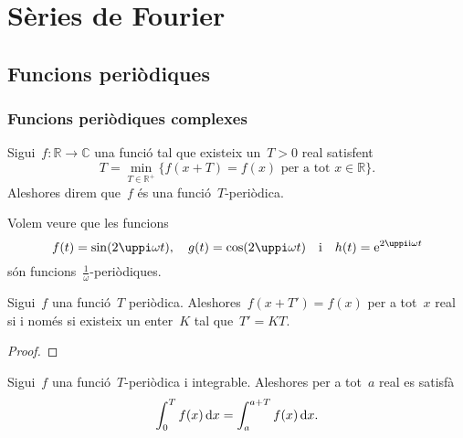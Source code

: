 \documentclass[../analisi-matematica.tex]{subfiles}
\begin{document}
\chapter{Sèries de Fourier}
\section{Funcions periòdiques}
    \subsection{Funcions periòdiques complexes}
    \begin{definition}
        \label{def:funcio-periodica}
        Sigui~\(f\colon\mathbb{R}\longrightarrow\mathbb{C}\) una funció tal que existeix un~\(T>0\) real satisfent
        \[
            T=\min_{T\in\mathbb{R}^{+}}\{f(x+T)=f(x)\text{ per a tot }x\in\mathbb{R}\}.
        \]
        Aleshores direm que~\(f\) és una funció~\(T\)-periòdica.
    \end{definition}
    \begin{example}
        \label{ex:periode-del-sinus}
        \label{ex:periode-del-cosinus}
        \label{ex:periode-de-lexponencial-complexa}
        Volem veure que les funcions
        \[
            f(t)=\sin(2\uppi\omega t),\quad g(t)=\cos(2\uppi\omega t)\quad\text{i}\quad h(t)=\e^{2\uppi\iu\omega t}
        \]
        són funcions~\(\frac{1}{\omega}\)-periòdiques.
    \end{example}
    \begin{solution}
    \end{solution}
    \begin{lemma}
        Sigui~\(f\) una funció~\(T\) periòdica.
        Aleshores~\(f(x+T')=f(x)\) per a tot~\(x\) real si i només si existeix un enter~\(K\) tal que~\(T'=KT\).
    \end{lemma}
    \begin{proof}
    \end{proof}
    \begin{proposition}
        \label{prop:podem-despla-ar-la-integral-duna-funcio-T-periodica}
        Sigui~\(f\) una funció~\(T\)-periòdica i integrable.
        Aleshores per a tot~\(a\) real es satisfà
        \[
            \int_{0}^{T}f(x)\mathop{}\!\mathrm{d} x=\int_{a}^{a+T}f(x)\mathop{}\!\mathrm{d} x.
        \]
    \end{proposition}
\end{document}
